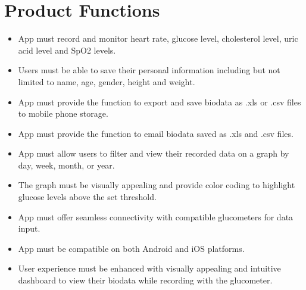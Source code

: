 \documentclass[a4paper]{scrreprt}
\begin{document}
\section{Product Functions}
\begin{itemize}
    \item App must record and monitor heart rate, glucose level, cholesterol level, uric acid level and SpO2 levels.
    \item Users must be able to save their personal information including but not limited to name, age, gender, height and weight.
    \item App must provide the function to export and save biodata as .xls or .csv files to mobile phone storage.
    \item App must provide the function to email biodata saved as .xls and .csv files.
    \item App must allow users to filter and view their recorded data on a graph by day, week, month, or year.
    \item The graph must be visually appealing and provide color coding to highlight glucose levels above the set threshold.
    \item App must offer seamless connectivity with compatible glucometers for data input.
    \item App must be compatible on both Android and iOS platforms.
    \item User experience must be enhanced with visually appealing and intuitive dashboard to view their biodata while recording with the glucometer.
\end{itemize}
\end{document}
